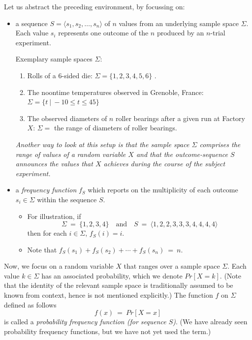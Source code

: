 Let us abstract the preceding environment, by focussing on:
\begin{itemize}
\item
a sequence $S = \langle s_1, s_2, \ldots, s_n \rangle$ of $n$ values
from an underlying sample space $\Sigma$.  Each value $s_i$ represents
one outcome of the $n$ produced by an $n$-trial experiment.

\smallskip

Exemplary sample spaces $\Sigma$:
  \begin{enumerate}
  \item
Rolls of a $6$-sided die: $\Sigma = \{1, 2, 3, 4, 5, 6\}$ .
  \item
The noontime temperatures observed in Grenoble, France:
$\Sigma = \{ t \ | \ -10 \leq t \leq 45\}$
  \item
The observed diameters of $n$ roller bearings after a given run at Factory $X$:
$\Sigma =$ the range of diameters of roller bearings.
\end{enumerate}

{\em Another way to look at this setup is that the sample space
  $\Sigma$ comprises the range of values of a random variable $X$ and
  that the outcome-sequence $S$ announces the values that $X$ achieves
  during the course of the subject experiment.}

\item
a {\it frequency function} $f_S$ which reports on the multiplicity of each outcome
$s_i \in \Sigma$ within the sequence $S$.
  \begin{itemize}
  \item
For illustration, if 
\begin{equation}
\label{eq:sample-seq-10}
\Sigma \ = \  \{1, 2, 3, 4\} \ \ \ \mbox{ and } \ \ \
S \ = \ \langle 1, 2, 2, 3, 3, 3, 4, 4, 4, 4 \rangle
\end{equation}
then for each $i \in \Sigma$, $f_S(i) = i$.
  \item
Note that $f_S(s_1) + f_S(s_2) + \cdots + f_S(s_n) \ = \ n$.
  \end{itemize}
\end{itemize}

\smallskip


Now, we focus on a random variable $X$ that ranges over a sample space $\Sigma$.  Each value $k \in \Sigma$ has an associated probability, which we denote $Pr[X=k]$.  (Note that the identity of the relevant sample space is traditionally assumed to be known from context, hence is not mentioned explicitly.)
The function $f$ on $\Sigma$ defined as follows
\[ f(x) \ = \ Pr[X=x] \]
is called a {\it probability frequency function (for sequence $S$)}.  (We have already seen probability frequency functions, but we have not yet used the term.)

